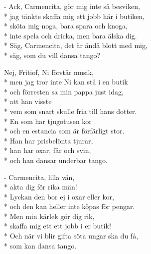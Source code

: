 \begin{SongText}
\begin{SongVerse}
    \end{SongVerse}
    \begin{SongVerse}
        - Ack, Carmencita, gör mig inte så besviken,\\*%
        jag tänkte skaffa mig ett jobb här i 
        butiken,\\*%
        sköta mig noga, bara spara och knoga,\\*%
        inte spela och dricka, men bara älska dig.\\*%
        Säg, Carmencita, det är ändå blott med mig,\\*%
        säg, som du vill dansa tango? 
    \end{SongVerse}
    \begin{SongVerse}
        Nej, Fritiof, Ni förstår musik,\\*%
        men jag tror inte Ni kan stå i en butik\\*%
        och förresten sa min pappa just idag,\\*%
        att han visste\\*%
        vem som snart skulle fria till hans dotter.\\*%
        En som har tjugotusen kor\\*%
        och en estancia som är förfärligt stor.\\*%
        Han har prisbelönta tjurar,\\*%
        han har oxar, får och svin,\\*%
        och han dansar underbar tango.
    \end{SongVerse}
    \begin{SongVerse}
        - Carmencita, lilla vän,\\*%
        akta dig för rika män!\\*%
        Lyckan den bor ej i oxar eller kor,\\*%
        och den kan heller inte köpas för pengar.\\*%
        Men min kärlek gör dig rik,\\*%
        skaffa mig ett ett jobb i er butik!\\*%
        Och när vi blir gifta söta ungar ska du få,\\*%
        som kan dansa tango. 
    \end{SongVerse}
\end{SongText}